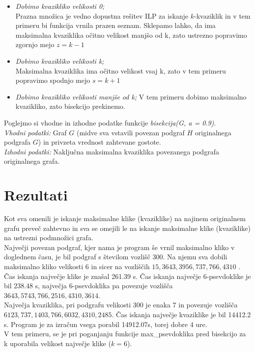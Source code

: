 \documentclass[12pt,a4paper]{amsart}
\theoremstyle{definition}
\theoremstyle{plain}
\begin{document}
\begin{itemize}
\begin{itemize}
\item \textit{Dobimo kvazikliko velikosti 0;}\\ Prazna množica je vedno dopustna rešitev ILP za iskanje $k$-kvaziklik in v tem primeru bi funkcija vrnila prazen seznam. Sklepamo lahko, da ima maksimalna kvaziklika očitno velikost manjšo od k, zato ustrezno popravimo zgornjo mejo $z = k-1$\\

\item \textit{Dobimo kvazikliko velikosti k;}\\
Maksimalna kvaziklika ima očitno velikost vsaj k, zato  v tem primeru popravimo spodnjo mejo $s=k+1$\\

\item \textit{Dobimo kvazikliko velikosti manjše od k;}
V tem primeru dobimo  maksimalno kvazikliko, zato bisekcijo prekinemo.\\
\end{itemize}

Poglejmo si vhodne in izhodne podatke funkcije \textit{bisekcija(G, a = 0.9)}.\\
 
\textit{Vhodni podatki:} Graf $G$ (midve sva vstavili povezan podgraf $H$ originalnega podgrafa $G$) in privzeta vrednost zahtevane gostote.
\\

\textit{Izhodni podatki:} Naključna maksimalna kvaziklika povezanega podgrafa originalnega grafa.

\end{itemize}

\section{Rezultati}

Kot sva omenili je iskanje maksimalne klike (kvaziklike) na najinem originalnem grafu preveč zahtevno in sva se omejili le na iskanje maksimalne klike (kvaziklike) na ustrezni podmnožici grafa.\\

Največji povezan podgraf, kjer nama je program še vrnil maksimalno kliko v doglednem času, je bil podgraf s številom vozlišč $300$. Na njemu sva dobili maksimalno kliko velikosti $6$ in sicer na vozliščih $15, 3643, 3956, 737, 766, 4310$ . Čas iskanja največje klike je znašal 261.39 s. Čas iskanja največje 6-psevdoklike je bil 238.48 s, največja 6-psevdoklika pa povezuje vozlišča $3643, 5743, 766, 2516, 4310, 3614$. \\Največja kvaziklika, pri podgrafu velikosti 300 je enaka 7 in povezuje vozlišča \\$6123, 737, 1403, 766, 6032, 4310, 2485$. Čas iskanja največje kvaziklike je bil 14412.2 s. Program je za izračun vsega porabil 14912.07s, torej dobre 4 ure.\\
V tem primeru, se je pri poganjanju funkcije max\_psevdoklika pred bisekcijo za k uporabila velikost največje klike ($k = 6$).
\\
\end{document}
